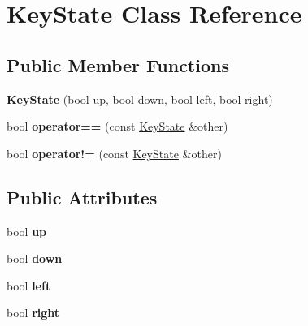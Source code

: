 \hypertarget{class_key_state}{\section{Key\-State Class Reference}
\label{class_key_state}
}
\subsection*{Public Member Functions}
\begin{DoxyCompactItemize}
\item 
\hypertarget{class_key_state_a225049e5d6f1bc6e914c81d7dc6f97b2}{{\bfseries Key\-State} (bool up, bool down, bool left, bool right)}\label{class_key_state_a225049e5d6f1bc6e914c81d7dc6f97b2}

\item 
\hypertarget{class_key_state_ac1327d75edde0c7b5daf5e4009c4fc6f}{bool {\bfseries operator==} (const \hyperlink{class_key_state}{Key\-State} \&other)}\label{class_key_state_ac1327d75edde0c7b5daf5e4009c4fc6f}

\item 
\hypertarget{class_key_state_a93b8cf2e65c8055803f1633cb1c74776}{bool {\bfseries operator!=} (const \hyperlink{class_key_state}{Key\-State} \&other)}\label{class_key_state_a93b8cf2e65c8055803f1633cb1c74776}

\end{DoxyCompactItemize}
\subsection*{Public Attributes}
\begin{DoxyCompactItemize}
\item 
\hypertarget{class_key_state_aee741b57639d1b11b63c2e40416e482c}{bool {\bfseries up}}\label{class_key_state_aee741b57639d1b11b63c2e40416e482c}

\item 
\hypertarget{class_key_state_a85ea4df350911a6ebe8314418b190071}{bool {\bfseries down}}\label{class_key_state_a85ea4df350911a6ebe8314418b190071}

\item 
\hypertarget{class_key_state_a44036306a5c13b07ae998e4aea86f52d}{bool {\bfseries left}}\label{class_key_state_a44036306a5c13b07ae998e4aea86f52d}

\item 
\hypertarget{class_key_state_a15f5326fae7f6f1b65389a4f8bac13ef}{bool {\bfseries right}}\label{class_key_state_a15f5326fae7f6f1b65389a4f8bac13ef}

\end{DoxyCompactItemize}

